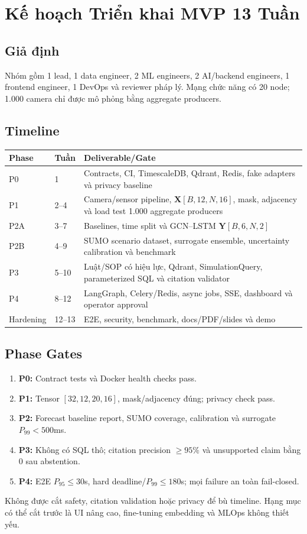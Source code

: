 \chapter{Kế hoạch Triển khai MVP 13 Tuần}

\section{Giả định}

Nhóm gồm 1 lead, 1 data engineer, 2 ML engineers, 2 AI/backend engineers, 1 frontend engineer, 1 DevOps và reviewer pháp lý. Mạng chức năng có 20 node; 1.000 camera chỉ được mô phỏng bằng aggregate producers.

\section{Timeline}

\begin{longtable}{p{2cm} p{3cm} p{8cm}}
\toprule
\textbf{Phase} & \textbf{Tuần} & \textbf{Deliverable/Gate} \\
\midrule
P0 & 1 & Contracts, CI, TimescaleDB, Qdrant, Redis, fake adapters và privacy baseline \\
P1 & 2--4 & Camera/sensor pipeline, $\mathbf{X}[B,12,N,16]$, mask, adjacency và load test 1.000 aggregate producers \\
P2A & 3--7 & Baselines, time split và GCN--LSTM $\mathbf{Y}[B,6,N,2]$ \\
P2B & 4--9 & SUMO scenario dataset, surrogate ensemble, uncertainty calibration và benchmark \\
P3 & 5--10 & Luật/SOP có hiệu lực, Qdrant, SimulationQuery, parameterized SQL và citation validator \\
P4 & 8--12 & LangGraph, Celery/Redis, async jobs, SSE, dashboard và operator approval \\
Hardening & 12--13 & E2E, security, benchmark, docs/PDF/slides và demo \\
\bottomrule
\end{longtable}

\section{Phase Gates}

\begin{enumerate}
  \item \textbf{P0:} Contract tests và Docker health checks pass.
  \item \textbf{P1:} Tensor $[32,12,20,16]$, mask/adjacency đúng; privacy check pass.
  \item \textbf{P2:} Forecast baseline report, SUMO coverage, calibration và surrogate $P_{99}<500$ms.
  \item \textbf{P3:} Không có SQL thô; citation precision $\geq95\%$ và unsupported claim bằng 0 sau abstention.
  \item \textbf{P4:} E2E $P_{95}\leq30$s, hard deadline/$P_{99}\leq180$s; mọi failure an toàn fail-closed.
\end{enumerate}

Không được cắt safety, citation validation hoặc privacy để bù timeline. Hạng mục có thể cắt trước là UI nâng cao, fine-tuning embedding và MLOps không thiết yếu.
